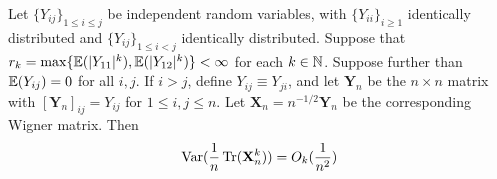 \begin{proposition}
  \label{prop:matrix_moments_convergence_probability}
  \notready
  Let $\{Y_{ij}\}_{1 \leq i \leq j}$ be independent random variables, with $\{Y_{ii}\}_{i\geq 1}$ identically distributed and $\{Y_{ij}\}_{1 \leq i < j}$ identically distributed. Suppose that $r_k = \max\{\mathbb{E}(|Y_{11}|^k),\mathbb{E}(|Y_{12}|^k)\} < \infty$ for each $k\in\mathbb{N}$. Suppose further than $\mathbb{E}(Y_{ij})=0$ for all $i,j$. If $i>j$, define $Y_{ij} \equiv Y_{ji}$, and let $\mathbf{Y}_n$ be the $n\times n$ matrix with $[\mathbf{Y}_n]_{ij} = Y_{ij}$ for $1\le i,j\le n$. Let $\mathbf{X}_n = n^{-1/2}\mathbf{Y}_n$ be the corresponding Wigner matrix. Then
  $$
  \operatorname{Var}(\frac{1}{n}\operatorname{Tr}(\mathbf{X}_{n}^{k})) = O_{k}(\frac{1}{n^2})
  $$ 
\end{proposition}
